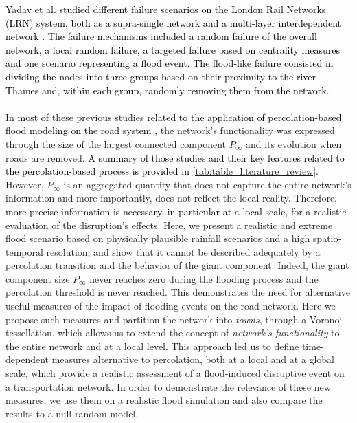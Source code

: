 \documentclass[twocolumn,fleqn,10pt]{wlscirep}
\begin{document}
\textcolor{black}{
Yadav et al. \cite{Yadav} studied different failure scenarios on the London Rail Networks (LRN) system, both as a supra-single network and a multi-layer interdependent network \cite{Kivela2014, Bianconi2018}. The failure mechanisms included a random failure of the overall network, a local random failure, a targeted failure based on centrality measures and one scenario representing a flood event. The flood-like failure consisted in dividing the nodes into three groups based on their proximity to the river Thames and, within each group, randomly removing them from the network.}
\\
\\
In \textcolor{black}{most of} these previous studies 
\textcolor{black}{related to the application of percolation-based flood modeling on the road system}
\cite{Abdulla2019_conference_paper,Abdulla2020_conference_paper,Abdulla2020_SIS,Abdulla2021,Fan2020,Farahmand2020,Dong2020a,Dong2020b,Ganin,Wang2019,Yadav}, the network's functionality was expressed through the size of the largest connected component $P_\infty$ and its evolution when roads are removed.
\textcolor{black}{
A summary of those studies and their key features related to the percolation-based process is provided in} 
\textcolor{black}{\cref{tab:table_literature_review}.} 
However, $P_\infty$ is an aggregated quantity that does not capture the entire network's information and more importantly, does not reflect the local reality. Therefore, \textcolor{black}{more precise information is necessary, in particular at a local scale,} for a realistic evaluation of the disruption's effects. 
Here, we present a realistic and extreme flood scenario \cite{Zischg} based on physically plausible rainfall scenarios and a high spatio-temporal resolution, and show that it cannot be described adequately by a percolation transition and the behavior of the giant component. 
Indeed, the giant component size $P_{\infty}$ never reaches zero during the flooding process and the percolation threshold is never reached. This demonstrates the need for alternative useful measures of the impact of flooding events on the road network. Here we propose such measures and partition the network into \emph{towns}, through a Voronoi tessellation, which allows us to extend the concept of \emph{network's functionality} to the entire network and at a local level.  This approach led us to define time-dependent measures alternative to percolation, both at a local and at a global scale, which provide a realistic assessment of a flood-induced disruptive event on a transportation network. In order to demonstrate the relevance of these new measures, we use them on a realistic flood simulation and also compare the results to a null random model. 
\end{document}
